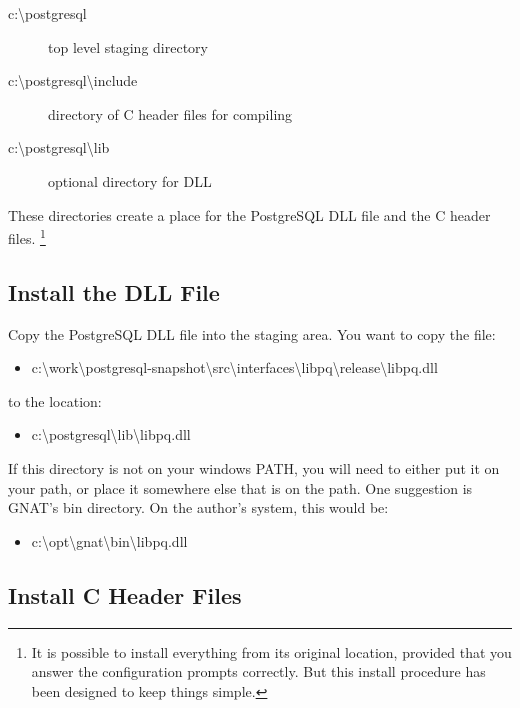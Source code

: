 \documentclass[english]{report}
\newenvironment{lyxcode}
   {\begin{list}{}{
     \setlength{\rightmargin}{\leftmargin}
     \setlength{\listparindent}{0pt}%
     \raggedright
     \setlength{\itemsep}{0pt}
     \setlength{\parsep}{0pt}
     \normalfont\ttfamily}%
    \item[]}
   {\end{list}}
\begin{document}
\begin{description}
\item [c:\textbackslash{}postgresql]top level staging directory
\item [c:\textbackslash{}postgresql\textbackslash{}include]directory of
C header files for compiling
\item [c:\textbackslash{}postgresql\textbackslash{}lib]optional directory
for DLL
\end{description}
These directories create a place for the PostgreSQL DLL file and the
C header files.%
\footnote{It is possible to install everything from its original location, provided
that you answer the configuration prompts correctly. But this install
procedure has been designed to keep things simple.%
}


\subsection{Install the DLL File}

Copy the PostgreSQL DLL file into the staging area. You want to copy
the file:

\begin{itemize}
\item c:\textbackslash{}work\textbackslash{}postgresql-snapshot\textbackslash{}src\textbackslash{}interfaces\textbackslash{}libpq\textbackslash{}release\textbackslash{}libpq.dll
\end{itemize}
to the location:

\begin{itemize}
\item c:\textbackslash{}postgresql\textbackslash{}lib\textbackslash{}libpq.dll
\end{itemize}
If this directory is not on your windows PATH, you will need to either
put it on your path, or place it somewhere else that is on the path.
One suggestion is GNAT's bin directory. On the author's system, this
would be:

\begin{itemize}
\item c:\textbackslash{}opt\textbackslash{}gnat\textbackslash{}bin\textbackslash{}libpq.dll
\end{itemize}
\begin{lyxcode}

\end{lyxcode}

\subsection{Install C Header Files}
\end{document}
